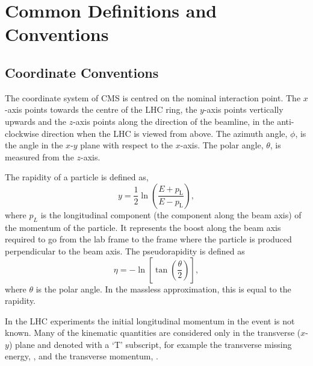 \chapter{Common Definitions and Conventions}

\section{Coordinate Conventions}
The coordinate system of CMS is centred on the nominal interaction point. The
$x$-axis points towards the centre of the LHC ring, the $y$-axis points vertically
upwards and the $z$-axis points along the direction of the beamline, in the
anti-clockwise direction when the LHC is viewed from above. 
The azimuth angle, $\phi$, is the angle in the $x$-$y$ plane with respect to the
$x$-axis.  The polar angle, $\theta$, is measured from the $z$-axis.

The rapidity of a particle is defined as,
\begin{equation}
    y = \frac{1}{2} \ln \left(\frac{E+p_\text{L}}{E-p_\text{L}}\right),
\label{eq:rapidity}
\end{equation}
where $p_{L}$ is the longitudinal component (the component along the beam axis)
of the momentum of the particle. It represents the boost along the beam axis
required to go from the lab frame to the frame where the particle is produced
perpendicular to the beam axis.
The pseudorapidity is defined as 
\begin{equation}
    \eta = -\ln\left[\tan\left(\frac{\theta}{2}\right)\right], 
\label{eq:pseudorapidity}
\end{equation}
where $\theta$ is the polar angle.  In the massless approximation, this is equal
to the rapidity.

In the LHC experiments the initial longitudinal momentum in the event is not
known. Many of the kinematic quantities are considered only in the transverse
($x$-$y$) plane and denoted with a `T' subscript, for example the transverse
missing energy, \ETm, and the transverse momentum, \pT.

